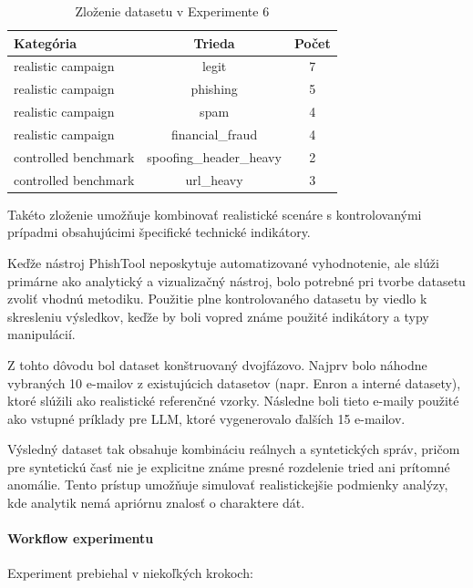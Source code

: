 \documentclass[conference]{IEEEtran}
\begin{document}
\begin{table}[!t]
\centering
\caption{Zloženie datasetu v Experimente 6}
\label{tab:exp6_dataset}
\footnotesize
\setlength{\tabcolsep}{4pt}
\renewcommand{\arraystretch}{1.1}
\begin{tabular}{lcc}
\toprule
\textbf{Kategória} & \textbf{Trieda} & \textbf{Počet} \\
\midrule
realistic campaign & legit & 7 \\
realistic campaign & phishing & 5 \\
realistic campaign & spam & 4 \\
realistic campaign & financial\_fraud & 4 \\
\midrule
controlled benchmark & spoofing\_header\_heavy & 2 \\
controlled benchmark & url\_heavy & 3 \\
\bottomrule
\end{tabular}
\end{table}

Takéto zloženie umožňuje kombinovať realistické scenáre s kontrolovanými
prípadmi obsahujúcimi špecifické technické indikátory.

Keďže nástroj PhishTool neposkytuje automatizované vyhodnotenie, ale slúži
primárne ako analytický a vizualizačný nástroj, bolo potrebné pri tvorbe
datasetu zvoliť vhodnú metodiku. Použitie plne kontrolovaného datasetu by
viedlo k skresleniu výsledkov, keďže by boli vopred známe použité indikátory
a typy manipulácií.

Z tohto dôvodu bol dataset konštruovaný dvojfázovo. Najprv bolo náhodne
vybraných 10 e-mailov z existujúcich datasetov (napr. Enron a interné datasety),
ktoré slúžili ako realistické referenčné vzorky. Následne boli tieto e-maily
použité ako vstupné príklady pre LLM, ktoré vygenerovalo ďalších 15 e-mailov.

Výsledný dataset tak obsahuje kombináciu reálnych a syntetických správ,
pričom pre syntetickú časť nie je explicitne známe presné rozdelenie tried
ani prítomné anomálie. Tento prístup umožňuje simulovať realistickejšie
podmienky analýzy, kde analytik nemá apriórnu znalosť o charaktere dát.

\paragraph{Workflow experimentu}

Experiment prebiehal v niekoľkých krokoch:
\end{document}
